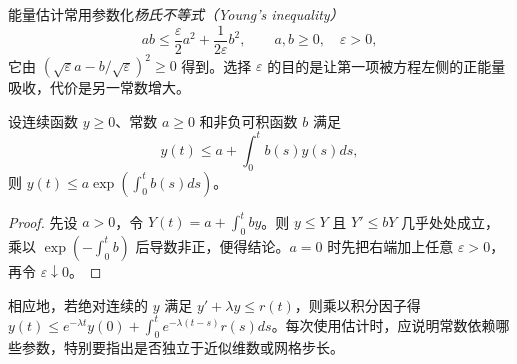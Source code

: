 能量估计常用参数化\emph{杨氏不等式（Young's inequality）}
\[
 ab\le\frac\varepsilon2 a^2+\frac1{2\varepsilon}b^2,\qquad a,b\ge0,\quad\varepsilon>0,
\]
它由 $(\sqrt\varepsilon a-b/\sqrt\varepsilon)^2\ge0$ 得到。选择 $\varepsilon$ 的目的是让第一项被方程左侧的正能量吸收，代价是另一常数增大。

\begin{lemma}
设连续函数 $y\ge0$、常数 $a\ge0$ 和非负可积函数 $b$ 满足
\[
 y(t)\le a+\int_0^t b(s)y(s)ds,
\]
则 $y(t)\le a\exp(\int_0^tb(s)ds)$。
\end{lemma}
\begin{proof}
先设 $a>0$，令 $Y(t)=a+\int_0^tby$。则 $y\le Y$ 且 $Y'\le bY$ 几乎处处成立，乘以 $\exp(-\int_0^tb)$ 后导数非正，便得结论。$a=0$ 时先把右端加上任意 $\varepsilon>0$，再令 $\varepsilon\downarrow0$。
\end{proof}
相应地，若绝对连续的 $y$ 满足 $y'+\lambda y\le r(t)$，则乘以积分因子得 $y(t)\le e^{-\lambda t}y(0)+\int_0^te^{-\lambda(t-s)}r(s)ds$。每次使用估计时，应说明常数依赖哪些参数，特别要指出是否独立于近似维数或网格步长。

